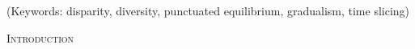 \documentclass[12pt,letterpaper]{article}
\renewcommand{\section}[1]{%
\bigskip
\begin{center}
\begin{Large}
\normalfont\scshape #1
\medskip
\end{Large}
\end{center}}
\begin{document}
\noindent (Keywords: disparity, diversity, punctuated equilibrium, gradualism, time slicing)\\

\vspace{1.5in}

\newpage 

%
%

\section{Introduction}





\end{document}
